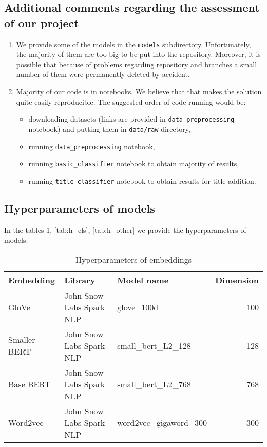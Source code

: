 \subsection{Additional comments regarding the assessment of our project}

\begin{enumerate}
    \item We provide some of the models in the \verb|models| subdirectory. Unfortunately, the majority of them are too big to be put into the repository. Moreover, it is possible that because of problems regarding repository and branches a small number of them were permanently deleted by accident.
    \item Majority of our code is in notebooks. We believe that that makes the solution quite easily reproducible. The suggested order of code running would be:
    \begin{itemize}
        \item downloading datasets (links are provided in \verb|data_preprocessing| notebook) and putting them in \verb|data/raw| directory,
        \item running \verb|data_preprocessing| notebook,
        \item running \verb|basic_classifier| notebook to obtain majority of results,
        \item running \verb|title_classifier| notebook to obtain results for title addition.
    \end{itemize}
\end{enumerate}

\subsection{Hyperparameters of models}
In the tables \ref{tab:h_emb}, \ref{tab:h_cls}, \ref{tab:h_other} we provide the hyperparameters of models.

\newpage
\onecolumn

\begin{table}[h]
\centering
\begin{tabular}{l|l|l|r}
\textbf{Embedding} & \textbf{Library} & \textbf{Model name} & \textbf{Dimension} \\\hline
GloVe & John Snow Labs Spark NLP & glove\_100d & 100 \\
Smaller BERT & John Snow Labs Spark NLP & small\_bert\_L2\_128 & 128 \\
Base BERT & John Snow Labs Spark NLP & small\_bert\_L2\_768 & 768 \\
Word2vec & John Snow Labs Spark NLP & word2vec\_gigaword\_300 & 300 \\
\end{tabular}
\caption{Hyperparameters of embeddings}
\label{tab:h_emb}
\end{table}

